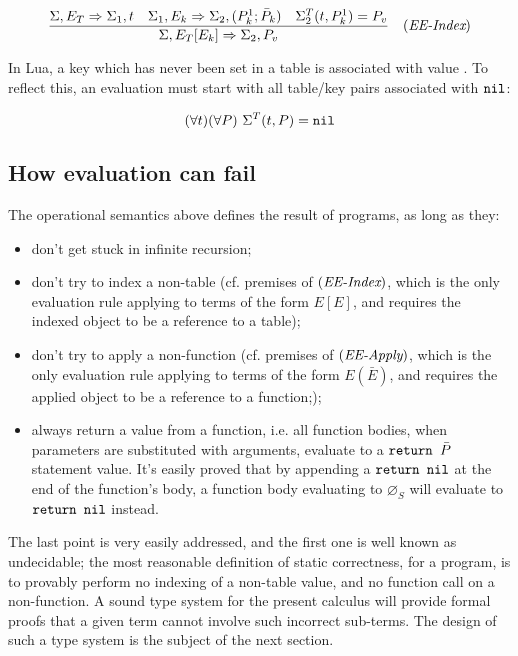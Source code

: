 $$\frac{
\Sigma,E_T \Rightarrow \Sigma_1, t
\quad
\Sigma_1, E_k \Rightarrow \Sigma_2, (P_k^1;\bar P_k)
\quad
\Sigma_2^T(t, P_k^1) = P_v
} {
\Sigma, E_T[E_k] \Rightarrow \Sigma_2, P_v
}\quad(\textit{EE-Index})$$

In Lua, a key which has never been set in a table is associated with
value \Nil. To reflect this, an evaluation must start with all
table/key pairs associated with $\texttt{nil}$:

$$(\forall t)(\forall P)\ \Sigma^T(t, P) = \texttt{nil}$$

\subsection{How evaluation can fail}

The operational semantics above defines the result of programs, as
long as they:
\begin{itemize}
\item don't get stuck in infinite recursion;
\item don't try to index a non-table (cf. premises of
  $(\textit{EE-Index})$, which is the only evaluation rule applying to
  terms of the form $E[E]$, and requires the indexed object to be a
  reference to a table);
\item don't try to apply a non-function (cf. premises of
  $(\textit{EE-Apply})$, which is the only evaluation rule applying to
  terms of the form $E(\bar E)$, and requires the applied object to be
  a reference to a function;);
\item always return a value from a function, i.e. all function bodies,
  when parameters are substituted with arguments, evaluate to a
  $\texttt{return\ }\bar P$ statement value. It's easily proved that by
  appending a $\texttt{return\ }\texttt{nil}$ at the end of the function's body, a
  function body evaluating to $\varnothing_S$ will evaluate to
  $\texttt{return\ }\texttt{nil}$ instead.
\end{itemize}

The last point is very easily addressed, and the first one is well
known as undecidable; the most reasonable definition of static
correctness, for a program, is to provably perform no indexing of a
non-table value, and no function call on a non-function. A sound type
system for the present calculus will provide formal proofs that a
given term cannot involve such incorrect sub-terms. The design of such
a type system is the subject of the next section.
